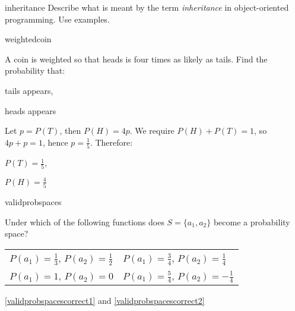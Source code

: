 

\begin{defproblem}{inheritance}
 Describe what is meant by the term \emph{inheritance} in
 object-oriented programming. Use examples.
\end{defproblem}

\begin{defproblem}{weightedcoin}%
  \begin{onlyproblem}
    A coin is weighted so that heads is four times as likely
    as tails. Find the probability that:
    \begin{textenum}
      \item tails appears,
      \item heads appears
    \end{textenum}%
  \end{onlyproblem}%
  \begin{onlysolution}
    Let $p=P(T)$, then $P(H)=4p$. We require $P(H)+P(T)=1$,
    so $4p+p=1$, hence $p=\frac{1}{5}$. Therefore:
    \begin{textenum}
      \item $P(T)=\frac{1}{5}$,
      \item $P(H)=\frac{4}{5}$
    \end{textenum}
  \end{onlysolution}
\end{defproblem}

\begin{defproblem}{validprobspaces}
\begin{onlyproblem}%
Under which of the following functions does
$S=\{a_1,a_2\}$ become a probability space?
\par
\begin{textenum}
\begin{tabular}{ll}
\item $P(a_1)=\frac{1}{3}$, $P(a_2)=\frac{1}{2}$
&
\item\label{validprobspacescorrect1} $P(a_1)=\frac{3}{4}$,
$P(a_2)=\frac{1}{4}$
\\
\item\label{validprobspacescorrect2} $P(a_1)=1$, $P(a_2)=0$
&
\item $P(a_1)=\frac{5}{4}$, $P(a_2)=-\frac{1}{4}$
\end{tabular}
\end{textenum}
\end{onlyproblem}%
\begin{onlysolution}%
\ref{validprobspacescorrect1} and \ref{validprobspacescorrect2}%
\end{onlysolution}
\end{defproblem}

